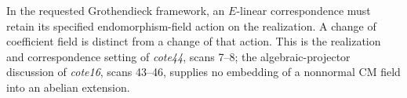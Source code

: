 In the requested Grothendieck framework, an
$E$-linear correspondence must retain its specified
endomorphism-field action on the realization. A
change of coefficient field is distinct from a
change of that action. This is the realization and
correspondence setting of \emph{cote44}, scans 7--8;
the algebraic-projector discussion of \emph{cote16},
scans 43--46, supplies no embedding of a nonnormal
CM field into an abelian extension.
